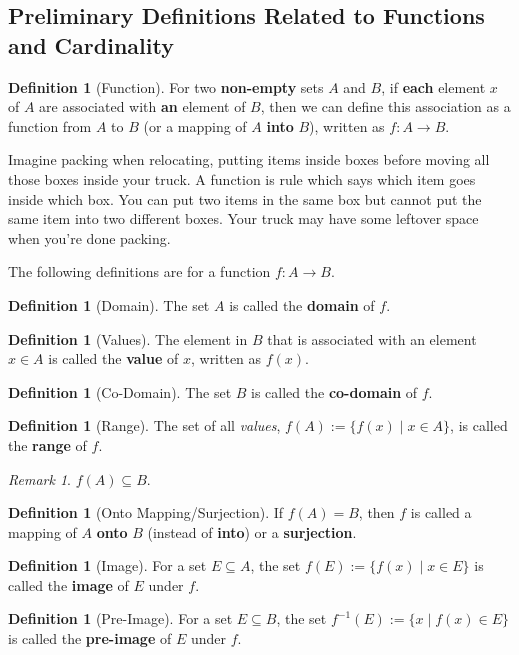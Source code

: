\documentclass[a4paper,12pt]{report}
\newcommand{\tb}{\textbf}
\theoremstyle{plain}
\theoremstyle{definition}
\newtheorem{definition}[theorem]{\color{red}Definition} %
\theoremstyle{remark}
\newtheorem{remark}[theorem]{\color{ForestGreen}Remark} %
\begin{document}
\subsection{Preliminary Definitions Related to Functions and Cardinality}
\begin{definition}[Function]
For two \tb{non-empty} sets $A$ and $B$, if \tb{each} element $x$ of $A$ are associated with \tb{an} element of $B$, then we can define this association as a function from $A$ to $B$ (or a mapping of $A$ \tb{into} $B$), written as $f:A\to B$.
\end{definition}
\begin{insight}
Imagine packing when relocating, putting items inside boxes before moving all those boxes inside your truck. A function is rule which says which item goes inside which box. You can put two items in the same box but cannot put the same item into two different boxes. Your truck may have some leftover space when you're done packing.
\end{insight}
The following definitions are for a function $f:A\to B$.
\begin{definition}[Domain]
The set $A$ is called the \tb{domain} of $f$.
\end{definition}
\begin{definition}[Values]
The element in $B$ that is associated with an element $x\in A$ is called the \tb{value} of $x$, written as $f(x)$.
\end{definition}
\begin{definition}[Co-Domain]
The set $B$ is called the \tb{co-domain} of $f$.
\end{definition}
\begin{definition}[Range]
The set of all \emph{values}, $f(A):=\{f(x)\mid x\in A\}$, is called the \tb{range} of $f$.
\end{definition}
\begin{remark}
$f(A)\subseteq B$.
\end{remark}
\begin{definition}[Onto Mapping/Surjection]
If $f(A)=B$, then $f$ is called a mapping of $A$ \tb{onto} $B$ (instead of \tb{into}) or a \tb{surjection}.
\end{definition}
\begin{definition}[Image]
For a set $E\subseteq A$, the set $f(E):=\{f(x)\mid x\in E\}$ is called the \tb{image} of $E$ under $f$.
\end{definition}
\begin{definition}[Pre-Image]
For a set $E\subseteq B$, the set $f^{-1}(E):=\{x\mid f(x)\in E\}$ is called the \tb{pre-image} of $E$ under $f$.
\end{definition}
\end{document}
